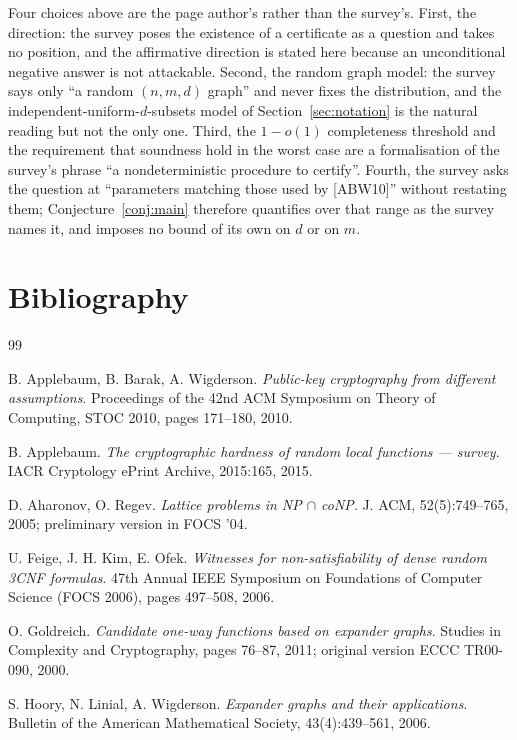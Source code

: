 \documentclass{aicr-conjecture}
\begin{document}
\begin{remark}\label{rem:readings}
Four choices above are the page author's rather than the survey's.
First, the direction: the survey poses the existence of a certificate
as a question and takes no position, and the affirmative direction is
stated here because an unconditional negative answer is not attackable.
Second, the random graph model: the survey says only ``a random
$(n,m,d)$ graph'' and never fixes the distribution, and the
independent-uniform-$d$-subsets model of Section~\ref{sec:notation} is
the natural reading but not the only one. Third, the $1-o(1)$
completeness threshold and the requirement that soundness hold in the
worst case are a formalisation of the survey's phrase ``a
nondeterministic procedure to certify''. Fourth, the survey asks the
question at ``parameters matching those used by [ABW10]'' without
restating them; Conjecture~\ref{conj:main} therefore quantifies over
that range as the survey names it, and imposes no bound of its own on
$d$ or on $m$.
\end{remark}

\section{Bibliography}

\begin{aicrbibliography}{99}

B. Applebaum, B. Barak, A. Wigderson.
\emph{Public-key cryptography from different assumptions}.
Proceedings of the 42nd ACM Symposium on Theory of Computing, STOC
2010, pages 171--180, 2010.

B. Applebaum.
\emph{The cryptographic hardness of random local functions --- survey}.
IACR Cryptology ePrint Archive, 2015:165, 2015.

D. Aharonov, O. Regev.
\emph{Lattice problems in NP $\cap$ coNP}.
J. ACM, 52(5):749--765, 2005; preliminary version in FOCS '04.

U. Feige, J. H. Kim, E. Ofek.
\emph{Witnesses for non-satisfiability of dense random 3CNF formulas}.
47th Annual IEEE Symposium on Foundations of Computer Science (FOCS
2006), pages 497--508, 2006.

O. Goldreich.
\emph{Candidate one-way functions based on expander graphs}.
Studies in Complexity and Cryptography, pages 76--87, 2011; original
version ECCC TR00-090, 2000.

S. Hoory, N. Linial, A. Wigderson.
\emph{Expander graphs and their applications}.
Bulletin of the American Mathematical Society, 43(4):439--561, 2006.

\end{aicrbibliography}
\end{document}
